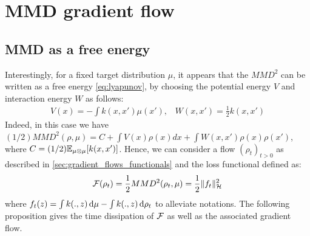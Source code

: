 

\section{MMD gradient flow}\label{sec:mmd_flow}

\subsection{MMD as a free energy}

Interestingly, for a fixed target distribution $\mu$, it appears that the $MMD^2$ can be written
as a free energy \cref{eq:lyapunov}, by choosing the potential energy $V$ and interaction energy $W$ as follows:
\begin{align}
V(x)=-\int  k(x,x')\mu(x')\text{,} \quad
W(x,x')=\frac{1}{2}k(x,x')
\end{align}
Indeed, in this case we have $(1/2)MMD^2(\rho,\mu)=C+ \int V(x) \rho(x)dx + \int W(x,x')\rho(x)\rho(x')$, where $C=(1/2){{\mathbb E}}_{\mu\otimes \mu}[k(x,x')]$. 
 Hence, we can consider a flow $(\rho_t)_{t>0}$ as described in \cref{sec:gradient_flows_functionals} and the loss functional defined as:
\begin{equation}\label{eq:mmd_functional}
{{\mathcal F}}(\rho_t)=\frac{1}{2}MMD^2(\rho_t, \mu)=\frac{1}{2}\|f_t\|^2_{{{\mathcal H}}}
\end{equation} 
where $f_t(z)= \int k(.,z)\mathop{}\!\mathrm{d} \mu - \int k(.,z)\mathop{}\!\mathrm{d} \rho_t$ to alleviate notations. The following proposition gives the time dissipation of ${{\mathcal F}}$ as well as the associated gradient flow.

